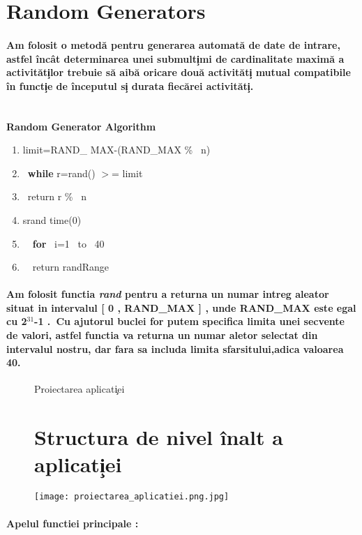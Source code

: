 \documentclass[12pt, a4paper,oneside]{article}
\begin{document}
\section{Random Generators}
\vspace{1em}
 \paragraph{Am folosit o metod\u a pentru generarea automat\u a de date de intrare, astfel \^ inc\^at determinarea unei submult\c imi de cardinalitate maxim\u a a activit\u at\c ilor trebuie s\u a aib\u a oricare dou\u a activit\u at\c i mutual compatibile \^in funct\c ie de \^inceputul s\c i  durata fiec\u arei activit\u at\c i.\\\ }
\textbf{ Random Generator Algorithm}
\begin{enumerate}
\item  limit=RAND\_ MAX-(RAND\_MAX \% \ n)\
\item   \ \textbf{while} r=rand() $>$= limit \
\item    \ return r \% \ n
\item   srand time(0) 
\item   \   \ \textbf{for } \ i=1 \ to \ 40
\item   \    \ return randRange 
\end{enumerate}
\large
\paragraph{Am folosit functia \textit{rand} pentru  a returna un numar intreg aleator situat in intervalul [ 0 ,  RAND\_MAX ]  , unde RAND\_MAX este egal cu 2$^ {31} $-1 .\  Cu ajutorul buclei for putem specifica limita unei secvente de valori, astfel functia va returna un numar aletor selectat din intervalul nostru, dar fara sa includa limita sfarsitului,adica valoarea 40.}
\Large
\begin{figure}
\begin{center}
\huge
{Proiectarea aplicat\c iei}
\vspace{3em}
\end{center}
\section{Structura de nivel \^inalt a aplicat\c iei}
\texttt{[image: proiectarea\_aplicatiei.png.jpg]}
\end{figure}
\Large 
\paragraph{Apelul functiei principale : \\ } \
\end{document}
